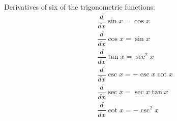 \begin{theorem}
Derivatives of six of the trigonometric functions:
\begin{align*}
    &\dfrac{d}{dx}\sin x = \cos x\\[2ex]
    &\dfrac{d}{dx}\cos x = \sin x\\[2ex]
    &\dfrac{d}{dx}\tan x = \sec^{2} x\\[2ex]
    &\dfrac{d}{dx}\csc x = -\csc x \cot x\\[2ex]
    &\dfrac{d}{dx}\sec x = \sec x \tan x\\[2ex]
    &\dfrac{d}{dx}\cot x = -\csc^{2} x
\end{align*}
\end{theorem}